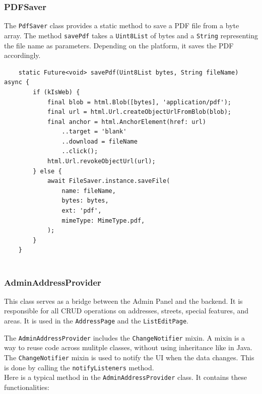 \subsubsection{PDFSaver}
The \texttt{PdfSaver} class provides a static method to save a PDF file from a byte array. The method \texttt{savePdf} takes a \texttt{Uint8List} of bytes and a \texttt{String} representing the file name as parameters. Depending on the platform, it saves the PDF accordingly.


\lstset{style=mycsharp, caption=savePdf method in PDFSaver}
\begin{lstlisting}
    static Future<void> savePdf(Uint8List bytes, String fileName) async {
        if (kIsWeb) {
            final blob = html.Blob([bytes], 'application/pdf');
            final url = html.Url.createObjectUrlFromBlob(blob);
            final anchor = html.AnchorElement(href: url)
                ..target = 'blank'
                ..download = fileName
                ..click();
            html.Url.revokeObjectUrl(url);
        } else {
            await FileSaver.instance.saveFile(
                name: fileName,
                bytes: bytes,
                ext: 'pdf',
                mimeType: MimeType.pdf,
            );
        }
    }
    
\end{lstlisting}
  \subsubsection{AdminAddressProvider}
This class serves as a bridge between the Admin Panel and the backend. It is responsible for all CRUD operations on addresses, streets, special features, and areas. It is used in the \texttt{AddressPage} and the \texttt{ListEditPage}. 

The \texttt{AdminAddressProvider} includes the \texttt{ChangeNotifier} mixin. A mixin is a way to reuse code across mulitple classes, without using inheritance like in Java.\autocite{dart.dev} The \texttt{ChangeNotifier} mixin is used to notify the UI when the data changes. \autocite{flutter.dev} This is done by calling the \texttt{notifyListeners} method.\\

Here is a typical method in the \texttt{AdminAddressProvider} class. It contains these functionalities:


